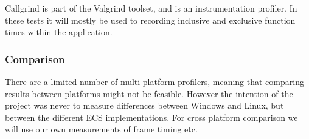 Callgrind is part of the Valgrind toolset, and is an instrumentation profiler. 
In these tests it will mostly be used to recording inclusive and exclusive function times within the application.

\subsubsection{Comparison}
There are a limited number of multi platform profilers, meaning that comparing results between platforms might not be feasible.
However the intention of the project was never to measure differences between Windows and Linux, but between the different ECS implementations. 
For cross platform comparison we will use our own measurements of frame timing etc.